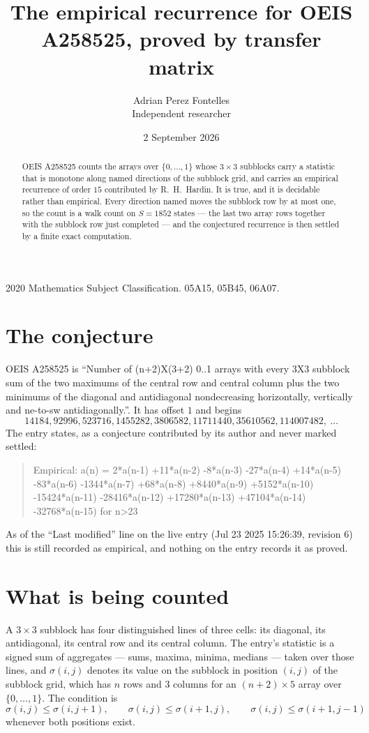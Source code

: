 \documentclass[11pt,a4paper]{article}
\title{The empirical recurrence for OEIS A258525, proved by transfer matrix}
\author{Adrian Perez Fontelles\\ \small Independent researcher}
\date{2 September 2026}
\theoremstyle{plain}
\theoremstyle{definition}
\begin{document}
\maketitle

\begin{abstract}
OEIS A258525 counts the arrays over $\{0,\dots,1\}$ whose $3\times3$ subblocks carry a
statistic that is monotone along named directions of the subblock grid, and carries an
empirical recurrence of order $15$ contributed by R.~H.~Hardin. It is true, and it is
decidable rather than empirical. Every direction named moves the subblock row by at most one,
so the count is a walk count on $S=1852$ states --- the last two array rows together with the
subblock row just completed --- and the conjectured recurrence is then settled by a finite
exact computation.
\end{abstract}

\noindent\small 2020 Mathematics Subject Classification. 05A15, 05B45, 06A07.\normalsize

\section{The conjecture}

OEIS A258525 is ``Number of (n+2)X(3+2) 0..1 arrays with every 3X3 subblock sum of the two maximums of the central row and central column plus the two minimums of the diagonal and antidiagonal nondecreasing horizontally, vertically and ne-to-sw antidiagonally.''. It has offset $1$ and begins
\[
14184, 92996, 523716, 1455282, 3806582, 11711440, 35610562, 114007482,\ \dots
\]
The entry states, as a conjecture contributed by its author and never marked settled:
\begin{quote}
Empirical: a(n) = 2*a(n-1) +11*a(n-2) -8*a(n-3) -27*a(n-4) +14*a(n-5) -83*a(n-6) -1344*a(n-7) +68*a(n-8) +8440*a(n-9) +5152*a(n-10) -15424*a(n-11) -28416*a(n-12) +17280*a(n-13) +47104*a(n-14) -32768*a(n-15) for n>23
\end{quote}
As of the ``Last modified'' line on the live entry (Jul 23 2025 15:26:39, revision 6) this is still
recorded as empirical, and nothing on the entry records it as proved.

\section{What is being counted}

A $3\times3$ subblock has four distinguished lines of three cells: its diagonal, its
antidiagonal, its central row and its central column. The entry's statistic is a signed sum of
aggregates --- sums, maxima, minima, medians --- taken over those lines, and $\sigma(i,j)$
denotes its value on the subblock in position $(i,j)$ of the subblock grid, which has $n$ rows
and $3$ columns for an $(n+2)\times5$ array over $\{0,\dots,1\}$. The condition is
\[
\sigma(i,j)\le\sigma(i,j+1),\qquad \sigma(i,j)\le\sigma(i+1,j),\qquad \sigma(i,j)\le\sigma(i+1,j-1)
\]
whenever both positions exist.
\end{document}
